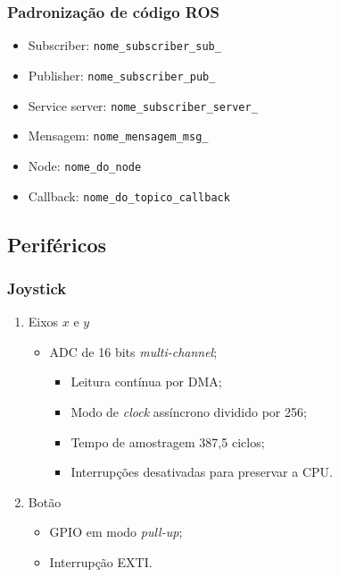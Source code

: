 \subsubsection*{Padronização de código ROS}
	
	\begin{itemize}
		\item Subscriber: \texttt{nome\_subscriber\_sub\_}
		\item Publisher: \texttt{nome\_subscriber\_pub\_}
		\item Service server: \texttt{nome\_subscriber\_server\_}
		\item Mensagem: \texttt{nome\_mensagem\_msg\_}
		\item Node: \texttt{nome\_do\_node}
		\item Callback: \texttt{nome\_do\_topico\_callback}
		
	\end{itemize}

\subsection{Periféricos}

\subsubsection*{Joystick}

\begin{enumerate}
	\item Eixos $x$ e $y$
	\begin{itemize}
		\item ADC de 16 bits \textit{multi-channel};
		\begin{itemize}
			\item Leitura contínua por DMA;
			\item Modo de \textit{clock} assíncrono dividido por 256;
			\item Tempo de amostragem 387,5 ciclos;
			\item Interrupções desativadas para preservar a CPU.
			
		\end{itemize}				
	\end{itemize}
	
	\item Botão
	\begin{itemize}
		\item GPIO em modo \textit{pull-up};
		\item Interrupção EXTI.
		
	\end{itemize}

\end{enumerate}

